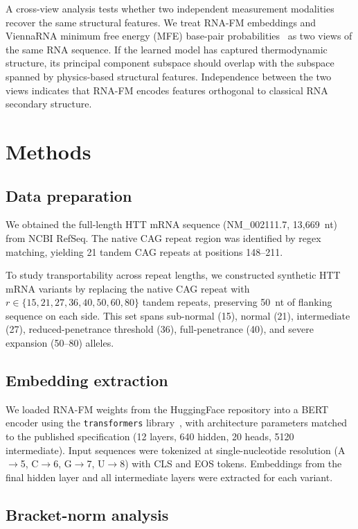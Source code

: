 \documentclass[11pt]{article}
\begin{document}
A cross-view analysis tests whether two independent measurement
modalities recover the same structural features. We treat RNA-FM
embeddings and ViennaRNA minimum free energy (MFE) base-pair
probabilities~\citep{lorenz2011viennarna} as two views of the same
RNA sequence. If the learned model has captured thermodynamic
structure, its principal component subspace should overlap with the
subspace spanned by physics-based structural features. Independence
between the two views indicates that RNA-FM encodes features
orthogonal to classical RNA secondary structure.


\section{Methods}
\label{sec:methods}

\subsection{Data preparation}

We obtained the full-length HTT mRNA sequence (NM\_002111.7,
13{,}669~nt) from NCBI RefSeq. The native CAG repeat region was
identified by regex matching, yielding 21 tandem CAG repeats at
positions 148--211.

To study transportability across repeat lengths, we constructed
synthetic HTT mRNA variants by replacing the native CAG repeat with
$r \in \{15, 21, 27, 36, 40, 50, 60, 80\}$ tandem repeats, preserving
50~nt of flanking sequence on each side. This set spans
sub-normal (15), normal (21), intermediate (27), reduced-penetrance
threshold (36), full-penetrance (40), and severe expansion (50--80)
alleles.

\subsection{Embedding extraction}

We loaded RNA-FM weights from the HuggingFace
repository into a BERT encoder using the
\texttt{transformers} library~\citep{wolf2020transformers}, with
architecture parameters matched to the published
specification (12 layers, 640 hidden, 20 heads, 5120 intermediate).
%
Input sequences were tokenized at single-nucleotide resolution
(A$\to$5, C$\to$6, G$\to$7, U$\to$8) with CLS and EOS tokens.
Embeddings from the final hidden layer and all intermediate layers
were extracted for each variant.

\subsection{Bracket-norm analysis}
\end{document}
